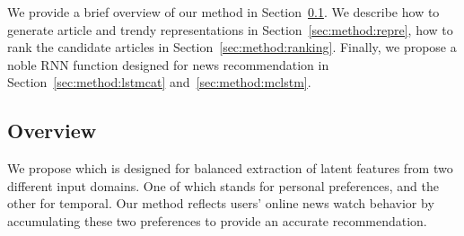 
%



We provide a brief overview of our method in Section~\ref{sec:method:overview}.
We describe how to generate article and trendy representations in Section~\ref{sec:method:repre},
how to rank the candidate articles in Section~\ref{sec:method:ranking}.
Finally, we propose a noble RNN function designed for news recommendation in Section~\ref{sec:method:lstmcat} and~\ref{sec:method:mclstm}.

\subsection{Overview}
\label{sec:method:overview}
We propose \method which is designed for balanced extraction of latent features from two different input domains.
One of which stands for personal preferences, and the other for temporal.
Our method reflects users’ online news watch behavior by accumulating these two preferences to provide an accurate recommendation. 

